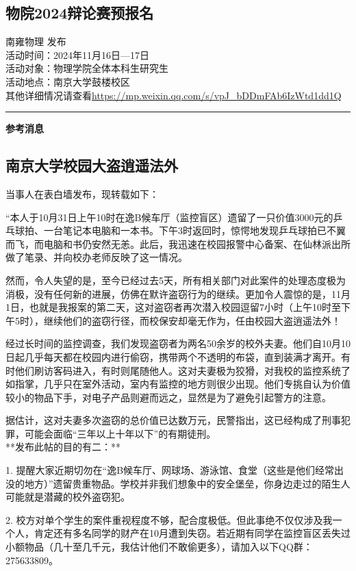 \documentclass[letterpaper, 12pt]{article}
\begin{document}
\begin{multicols}{2}
\section{物院2024辩论赛预报名}
南雍物理 发布\\
活动时间：2024年11月16日—17日\\
活动对象：物理学院全体本科生研究生\\
活动地点：南京大学鼓楼校区\\
其他详细情况请查看\url{https://mp.weixin.qq.com/s/vpJ_bDDmFAb6IzWtd1dd1Q}\\
\end{multicols} 
\hrule
\vspace{4mm}
\centerline{\huge\textbf{参考消息}}
\begin{multicols}{2}
\section{南京大学校园大盗逍遥法外}
当事人在表白墙发布，现转载如下：

“本人于10月31日上午10时在逸B候车厅（监控盲区）遗留了一只价值3000元的乒乓球拍、一台笔记本电脑和一本书。下午3时返回时，惊愕地发现乒乓球拍已不翼而飞，而电脑和书仍安然无恙。此后，我迅速在校园报警中心备案、在仙林派出所做了笔录、并向校办老师反映了这一情况。

然而，令人失望的是，至今已经过去5天，所有相关部门对此案件的处理态度极为消极，没有任何新的进展，仿佛在默许盗窃行为的继续。更加令人震惊的是，11月1日，也就是我报案的第二天，这对盗窃者再次潜入校园逗留7小时（上午10时至下午5时），继续他们的盗窃行径，而校保安却毫无作为，任由校园大盗逍遥法外！

经过长时间的监控调查，我们发现盗窃者为两名50余岁的校外夫妻。他们自10月10日起几乎每天都在校园内进行偷窃，携带两个不透明的布袋，直到装满才离开。有时他们刷访客码进入，有时则尾随他人。这对夫妻极为狡猾，对我校的监控系统了如指掌，几乎只在室外活动，室内有监控的地方则很少出现。他们专挑自认为价值较小的物品下手，对电子产品则避而远之，显然是为了避免引起警方的注意。

据估计，这对夫妻多次盗窃的总价值已达数万元，民警指出，这已经构成了刑事犯罪，可能会面临“三年以上十年以下”的有期徒刑。\\

**发布此帖的目的有二：**

1. 提醒大家近期切勿在“逸B候车厅、网球场、游泳馆、食堂（这些是他们经常出没的地方）”遗留贵重物品。学校并非我们想象中的安全堡垒，你身边走过的陌生人可能就是潜藏的校外盗窃犯。

2. 校方对单个学生的案件重视程度不够，配合度极低。但此事绝不仅仅涉及我一个人，肯定还有多名同学的财产在10月遭到失窃。若近期有同学在监控盲区丢失过小额物品（几十至几千元，我估计他们不敢偷更多），请加入以下QQ群：275633809。\\


\end{multicols}
\end{document}
